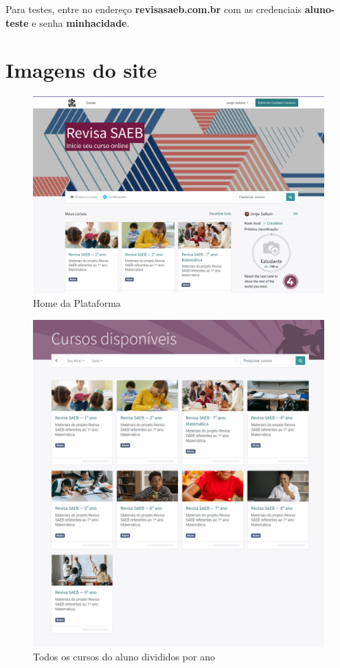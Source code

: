 Para testes, entre no endereço \textbf{revisasaeb.com.br} com 
as credenciais \textbf{aluno-teste} e senha \textbf{minhacidade}. 


 

\chapter{Imagens do site}

\begin{figure}[H]
\includegraphics[width=\textwidth]{imgs/front}
\caption{Home da Plataforma}
\end{figure}



\begin{figure}[H]
\includegraphics[width=\textwidth]{imgs/cursos}
\caption{Todos os cursos do aluno divididos por ano}
\end{figure}


